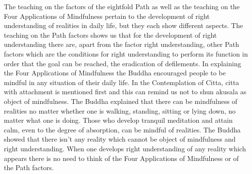 \documentclass{book}
\begin{document}
The teaching on the factors of the eightfold Path as well as the
teaching on the Four Applications of Mindfulness pertain to the
development of right understanding of realities in daily life, but they
each show different aspects. The teaching on the Path factors shows us
that for the development of right understanding there are, apart from
the factor right understanding, other Path factors which are the
conditions for right understanding to perform its function in order that
the goal can be reached, the eradi­cation of defilements. In explaining
the Four Applications of Mindfulness the Buddha encouraged people to be
mindful in any situation of their daily life. In the Contemplation of
Citta, citta with attach­ment is mentioned first and this can remind us
not to shun akusala as object of mindfulness. The Buddha explained that
there can be mindfulness of realities no matter whether one is walking,
standing, sitting or lying down, no matter what one is doing. Those who
develop tranquil meditation and attain calm, even to the degree of
absorption, can be mindful of realities. The Buddha showed that there
isn't any reality which cannot be object of mindfulness and right
understanding. When one develops right under­standing of any reality
which appears there is no need to think of the Four Applications of
Mindfulness or of the Path factors.
\end{document}

